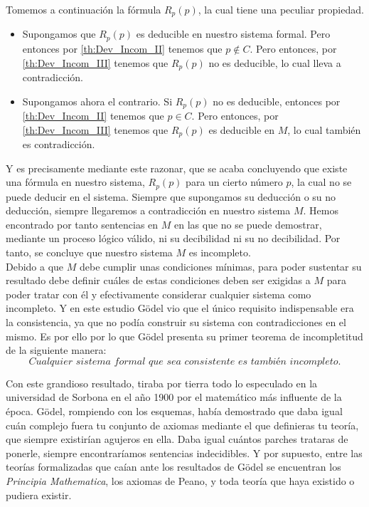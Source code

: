 Tomemos a continuación la fórmula $R_p(p)$, la cual tiene una peculiar propiedad. 
\begin{itemize}
    \item Supongamos que $R_p(p)$ es deducible en nuestro sistema formal. Pero entonces por \eqref{th:Dev_Incom_II} tenemos que $p \notin C$. Pero entonces, por \eqref{th:Dev_Incom_III} tenemos que $R_p(p)$ no es deducible, lo cual lleva a contradicción.
    \item Supongamos ahora el contrario. Si $R_p(p)$ no es deducible, entonces por \eqref{th:Dev_Incom_II} tenemos que $p \in C$. Pero entonces, por \eqref{th:Dev_Incom_III} tenemos que $R_p(p)$ es deducible en $M$, lo cual también es contradicción.
\end{itemize}

Y es precisamente mediante este razonar, que se acaba concluyendo que existe una fórmula en nuestro 
sistema, $R_p(p)$ para un cierto número $p$, la cual no se puede deducir en el sistema. Siempre que supongamos su deducción o su no deducción, siempre llegaremos a contradicción en nuestro sistema $M$. Hemos encontrado por tanto sentencias en $M$ en las que no se puede demostrar,
mediante un proceso lógico válido, ni su decibilidad ni su no decibilidad. Por tanto, se concluye que nuestro sistema $M$ es incompleto.\\

Debido a que $M$ debe cumplir unas condiciones mínimas, para poder sustentar su resultado debe definir cuáles de estas condiciones deben ser exigidas a $M$ para poder tratar con él y efectivamente considerar cualquier sistema como incompleto. Y en este estudio Gödel 
vio que el único requisito indispensable era la consistencia, ya que no podía construir su sistema con contradicciones en el mismo. Es por ello por lo que Gödel presenta su primer teorema de incompletitud de la siguiente manera:
\begin{equation}\label{th:God_Incomp_I}
    \textit{Cualquier sistema formal que sea consistente es también incompleto.} 
\end{equation}

Con este grandioso resultado, tiraba por tierra todo lo especulado en la universidad de Sorbona en el año 1900 por el matemático más influente de la época. Gödel, rompiendo con los esquemas, había demostrado que daba igual cuán complejo fuera tu conjunto de axiomas 
mediante el que definieras tu teoría, que siempre existirían agujeros en ella. Daba igual cuántos parches trataras de ponerle, siempre encontraríamos sentencias indecidibles. Y por supuesto, entre las teorías formalizadas que caían ante los 
resultados de Gödel se encuentran los \textit{Principia Mathematica}, los axiomas de Peano, y toda teoría que haya existido o pudiera existir.

